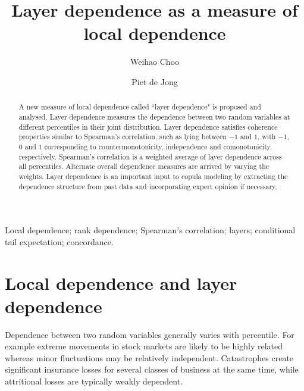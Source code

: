 \documentclass[authoryear]{elsarticle}
\begin{document}
\begin{frontmatter}



\title{Layer dependence as a measure of local dependence}
\author[acst]{Weihao Choo}
\author[acst]{Piet de Jong}



\address[acst]{Department of Applied Finance and Actuarial Studies Macquarie
University, NSW 2109, Australia.}




\begin{abstract}
A new measure of local dependence called  ``layer dependence" is proposed and analysed. Layer dependence measures the dependence between two random variables at different percentiles in their joint distribution. Layer dependence satisfies coherence properties similar to Spearman's correlation, such as lying between $-1$ and $1$, with $-1$, $0$ and $1$ corresponding to countermonotonicity, independence and comonotonicity, respectively. Spearman's correlation is  a weighted average of layer dependence across all percentiles.  Alternate overall dependence measures are arrived by varying the weights. Layer dependence is an important input to copula modeling by extracting the dependence structure from past data and incorporating expert opinion if necessary.
\end{abstract}

\begin{keyword}
Local dependence; rank dependence; Spearman's correlation; layers; conditional tail expectation; concordance.
\end{keyword}



\end{frontmatter}




\section{Local dependence and layer dependence}\label{sreview}


Dependence between two random variables generally varies with percentile. For example extreme movements in  stock markets are likely to be highly related  whereas minor fluctuations may be relatively independent.  Catastrophes create significant insurance losses for several classes of business at the same time, while attritional losses are typically weakly dependent.
\end{document}
